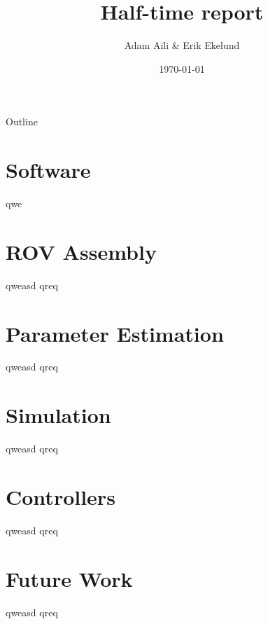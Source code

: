 \documentclass[11pt]{beamer}
\author{Adam Aili \& Erik Ekelund}
\title{Half-time report}
\date{\today}
\begin{document}
\begin{frame}
\titlepage
\end{frame}

\begin{frame}{Outline}
\tableofcontents
\end{frame}

\section{Software}
\begin{frame}{qwe}

\end{frame}

\begin{frame}

\end{frame}

\section{ROV Assembly}
\begin{frame}{qweasd}
qreq
\end{frame}

\section{Parameter Estimation}
\begin{frame}{qweasd}
qreq
\end{frame}

\section{Simulation}
\begin{frame}{qweasd}
qreq
\end{frame}

\section{Controllers}
\begin{frame}{qweasd}
qreq
\end{frame}

\section{Future Work}
\begin{frame}{qweasd}
qreq
\end{frame}
\end{document}
